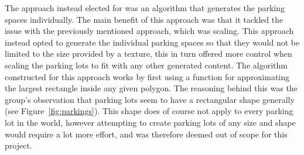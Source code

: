 The approach instead elected for was an algorithm that generates the parking spaces individually.
The main benefit of this approach was that it tackled the issue with the previously mentioned approach, which was scaling.
This approach instead opted to generate the individual parking spaces so that they would not be limited to the size provided by a texture, this in turn offered more control when scaling the parking lots to fit with any other generated content.
The algorithm constructed for this approach works by first using a function for approximating the largest rectangle inside any given polygon. 
The reasoning behind this was the group's observation that parking lots seem to have a rectangular shape generally (see Figure~\ref{fig:parkings}).
This shape does of course not apply to every parking lot in the world, however attempting to create parking lots of any size and shape would require a lot more effort, and was therefore deemed out of scope for this project. 
